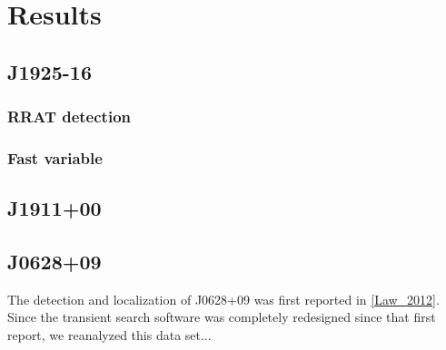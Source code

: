 \section{Results}

\subsection{J1925-16}
\subsubsection{RRAT detection}


\subsubsection{Fast variable}


\subsection{J1911+00}

\subsection{J0628+09}

The detection and localization of J0628+09 was first reported in \ref{Law_2012}. Since the transient search software was completely redesigned since that first report, we reanalyzed this data set...
  